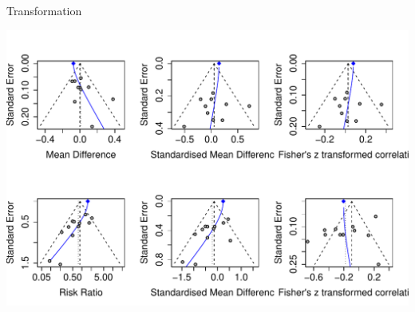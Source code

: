 \documentclass[english]{beamer}\usepackage[]{graphicx}\usepackage[]{color}
\makeatletter
\def\maxwidth{ %
  \ifdim\Gin@nat@width>\linewidth
    \linewidth
  \else
    \Gin@nat@width
  \fi
}
\newenvironment{knitrout}{}{} %
\makeatother
\begin{document}
\begin{frame}[fragile]{Transformation}

\vspace{-6mm}
\begin{knitrout}
\color{fgcolor}
\includegraphics[width=\maxwidth]{figure/unnamed-chunk-10-1} 

\end{knitrout}
\end{frame}
\end{document}
